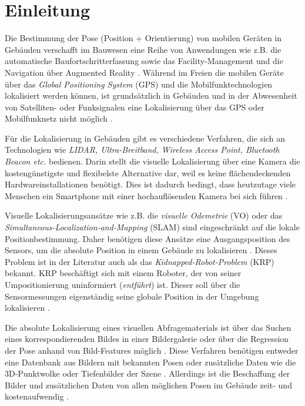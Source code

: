 
\section{Einleitung}
Die Bestimmung der Pose (Position + Orientierung) von mobilen Geräten in Gebäuden verschafft im Bauwesen eine Reihe von Anwendungen wie z.B. die automatische Baufortschritterfassung sowie das Facility-Management und die Navigation über Augmented Reality \cite{kroppModelbasedPoseEstimation2016, kochNaturalMarkersAugmented2014}.
Während im Freien die mobilen Geräte über das \textit{Global Positioning System} (GPS) und die Mobilfunktechnologien lokalisiert werden können, ist grundsätzlich in Gebäuden und in der Abwesenheit von Satelliten- oder Funksignalen eine Lokalisierung über das GPS oder Mobilfunknetz nicht möglich \cite{yassinRecentAdvancesIndoor2016}. 

Für die Lokalisierung in Gebäuden gibt es verschiedene Verfahren, die sich an Technologien wie \textit{LIDAR, Ultra-Breitband, Wireless Access Point, Bluetooth Beacon etc.} bedienen. Darin stellt die visuelle Lokalisierung über eine Kamera die kostengünstigste und flexibelste Alternative dar, weil es keine flächendeckenden Hardwareinstallationen benötigt. Dies ist dadurch bedingt, dass heutzutage viele Menschen ein Smartphone mit einer hochauflösenden Kamera bei sich führen \cite{wuImagebasedCameraLocalization2018}.

Visuelle Lokalisierungsansätze wie z.B. die 
\textit{visuelle Odemetrie} (VO) oder das \textit{Simultaneous-Localization-and-Mapping} (SLAM) sind eingeschränkt auf die lokale Positionbestimmung. Daher benötigen diese Ansätze eine Ausgangsposition des Sensors, um die absolute Position in einem Gebäude zu lokalisieren \cite{stephenseGlobalLocalizationUsing2002}. Dieses Problem ist in der Literatur auch als das \textit{Kidnapped-Robot-Problem} (KRP) bekannt. KRP beschäftigt sich mit einem  Roboter, der von seiner Umpositionierung uninformiert (\textit{entführt}) ist. Dieser soll über die Sensormessungen eigenständig seine globale Position in der Umgebung lokalisieren  \cite{acharyaBIMPoseNetIndoorCamera2019}.


Die absolute Lokalisierung eines visuellen Abfragematerials ist über das Suchen eines korrespondierenden Bildes in einer Bildergalerie oder über die Regression der Pose anhand von Bild-Features möglich \cite{piascoSurveyVisualBasedLocalization2018}. Diese Verfahren benötigen entweder eine Datenbank aus Bildern mit bekannten Posen \cite{zhangImageBasedLocalization2006, arandjelovicThreeThingsEveryone2012} oder zusätzliche Daten wie die 3D-Punktwolke \cite{irscharaStructurefrommotionPointClouds2009, liWorldwidePoseEstimation2012} oder Tiefenbilder der Szene \cite{shottonSceneCoordinateRegression2013}. Allerdings ist die Beschaffung der Bilder und zusätzlichen Daten von allen möglichen Posen im Gebäude zeit- und kostenaufwendig \cite{acharyaBIMPoseNetIndoorCamera2019}.


